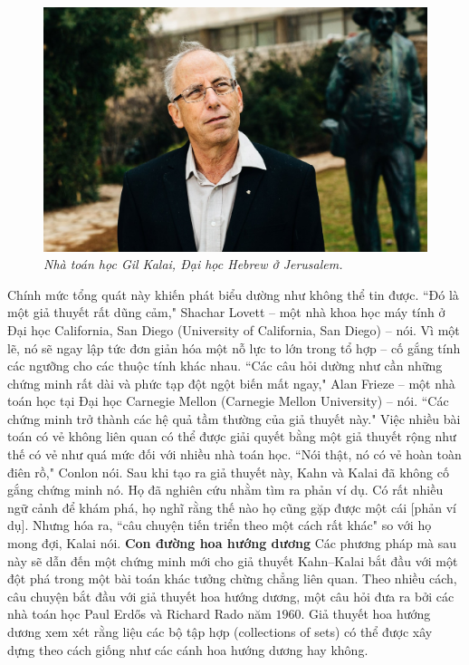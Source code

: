 \begin{multicols}{2}
		\begin{figure}[H]
		\vspace*{-5pt}
		\centering
		\captionsetup{labelformat= empty, justification=centering}
		\includegraphics[width= 1\linewidth]{3}
		\caption{\small\textit{\color{duongvaotoanhoc}Nhà toán học Gil Kalai, Đại học Hebrew ở Jerusalem.}}
		\vspace*{-15pt}
	\end{figure}
	Chính mức tổng quát này khiến phát biểu dường như không thể tin được. ``Đó là một giả thuyết rất dũng cảm," Shachar Lovett -- một nhà khoa học máy tính ở Đại học California, San Diego (University of California, San Diego) -- nói. Vì một lẽ, nó sẽ ngay lập tức đơn giản hóa một nỗ lực to lớn trong tổ hợp -- cố gắng tính các ngưỡng cho các thuộc tính khác nhau. ``Các câu hỏi dường như cần những chứng minh rất dài và phức tạp đột ngột biến mất ngay," Alan Frieze -- một nhà toán học tại Đại học Carnegie Mellon (Carnegie Mellon University) -- nói. ``Các chứng minh trở thành các hệ quả tầm thường của giả thuyết này."
	\vskip 0.1cm
	Việc nhiều bài toán có vẻ không liên quan có thể được giải quyết bằng một giả thuyết rộng như thế  có vẻ như quá mức  đối với nhiều nhà toán học. ``Nói thật, nó có vẻ hoàn toàn điên rồ," Conlon nói. Sau khi tạo ra giả thuyết này, Kahn và Kalai đã không cố gắng chứng minh nó. Họ đã nghiên cứu nhằm tìm ra phản ví dụ. Có rất nhiều ngữ cảnh để khám phá, họ nghĩ rằng thế nào họ cũng gặp được một cái [phản ví dụ].
	\vskip 0.1cm
	Nhưng hóa ra, ``câu chuyện tiến triển theo một cách rất khác" so với họ mong đợi, Kalai nói.
	\vskip 0.1cm
	\textbf{\color{duongvaotoanhoc}Con đường hoa hướng dương}
	\vskip 0.1cm
	Các phương pháp mà sau này sẽ dẫn đến một chứng minh mới cho giả thuyết Kahn--Kalai bắt đầu với một đột phá trong một bài toán khác tưởng chừng chẳng liên quan. Theo nhiều cách, câu chuyện bắt đầu với giả thuyết hoa hướng dương, một câu hỏi đưa ra bởi các nhà toán học Paul Erdős và Richard Rado năm $1960$. Giả thuyết hoa hướng dương xem xét rằng liệu các bộ tập hợp (collections of sets) có thể được xây dựng theo cách giống như các cánh hoa hướng dương hay không.

\end{multicols}
